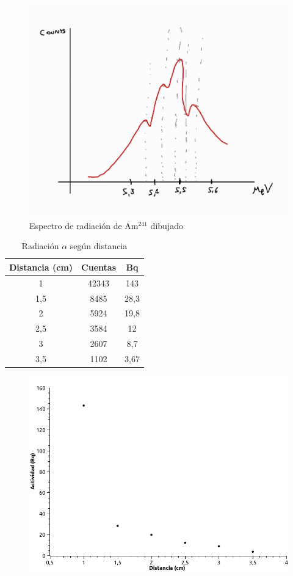 \documentclass[a4paper,12pt,spanish]{article}
\begin{document}
	
	
	\begin{figure}[H]
		\centering
		\includegraphics[width=0.7\linewidth]{imagenes/tempFileForShare_20240411-123131}
		\caption{Espectro de radiación de Am$^{241}$ dibujado}
		\label{fig:dibujo}
	\end{figure}
	
	
	\begin{table}[H]
		\centering
		\begin{tabular}{|c|c|c|}
			\hline
			Distancia (cm) & Cuentas & Bq   \\ \hline
			1              & 42343   & 143  \\ \hline
			1,5            & 8485    & 28,3 \\ \hline
			2              & 5924    & 19,8 \\ \hline
			2,5            & 3584    & 12   \\ \hline
			3              & 2607    & 8,7  \\ \hline
			3,5            & 1102    & 3,67 \\ \hline
		\end{tabular}
	\caption{Radiación $\alpha$ según distancia}
	\end{table}
	
	
	
	
\begin{figure}[H]
	\centering
	\includegraphics[width=0.9\linewidth]{imagenes/5_1}
	\caption[Actividad $\alpha$ según distancia]{}
	\label{fig:51}
\end{figure}
	
\end{document}
